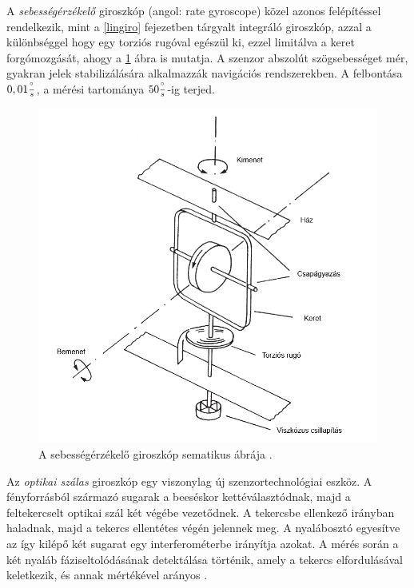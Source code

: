 A \textit{sebességérzékelő} giroszkóp (angol: rate gyroscope) közel azonos felépítéssel rendelkezik, mint a \ref{lingiro} fejezetben tárgyalt integráló giroszkóp, azzal a különbséggel hogy egy torziós rugóval egészül ki, ezzel limitálva a keret forgómozgását, ahogy a \ref{rategyro} ábra is mutatja. A szenzor abszolút szögsebességet mér, gyakran jelek stabilizálására alkalmazzák navigációs rendszerekben. A felbontása $0,01\frac{\degree}{s}$, a mérési tartománya $50\frac{\degree}{s}$-ig terjed.
\begin{figure}
	\centering
	\includegraphics[width=\columnwidth*5/10]{figures/rategyro.png}
	\caption{A sebességérzékelő giroszkóp sematikus ábrája \cite{Morris2016b}.}
	\label{rategyro}
\end{figure}
Az \textit{optikai szálas} giroszkóp egy viszonylag új szenzortechnológiai eszköz. A fényforrásból származó sugarak a beeséskor kettéválasztódnak, majd a feltekercselt optikai szál két végébe vezetődnek. A tekercsbe ellenkező irányban haladnak, majd a tekercs ellentétes végén jelennek meg. A nyalábosztó egyesítve az így kilépő két sugarat egy interferométerbe irányítja azokat. A mérés során a két nyaláb fáziseltolódásának detektálása történik, amely a tekercs elfordulásával keletkezik, és annak mértékével arányos \cite{Morris2016b}.

